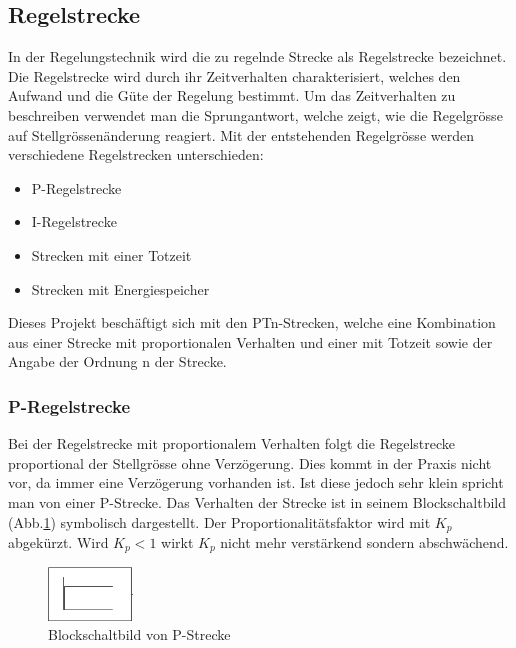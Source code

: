 
\subsection{Regelstrecke}
In der Regelungstechnik wird die zu regelnde Strecke als Regelstrecke bezeichnet. Die Regelstrecke wird durch ihr Zeitverhalten charakterisiert, welches den Aufwand und die Güte der Regelung bestimmt. Um das Zeitverhalten zu beschreiben verwendet man die Sprungantwort, welche zeigt, wie die Regelgrösse auf Stellgrössenänderung reagiert. Mit der entstehenden Regelgrösse werden verschiedene Regelstrecken unterschieden:
\begin{itemize}   
 \item  P-Regelstrecke
 \item I-Regelstrecke
 \item    Strecken mit einer Totzeit
 \item Strecken mit Energiespeicher
\end{itemize}

Dieses Projekt beschäftigt sich mit  den PTn-Strecken, welche eine Kombination aus einer Strecke mit proportionalen Verhalten und einer mit Totzeit sowie der Angabe der  Ordnung n der Strecke.

\subsubsection*{P-Regelstrecke}
Bei der Regelstrecke mit proportionalem Verhalten folgt die Regelstrecke proportional der Stellgrösse ohne Verzögerung. Dies kommt in der Praxis nicht vor, da immer eine Verzögerung vorhanden ist. Ist diese jedoch sehr klein spricht man von einer P-Strecke. Das Verhalten der Strecke ist in seinem Blockschaltbild (Abb.\ref {fig:PStrecke}) symbolisch dargestellt. Der Proportionalitätsfaktor wird mit $K_p$ abgekürzt. Wird $K_p<1$ wirkt $K_p$ nicht mehr verstärkend sondern abschwächend.\\
\begin{figure}[h!, width=\pagewidth]
\begin{center}
\includegraphics[width=0.2\textwidth]{images/PStrecke}
\caption{Blockschaltbild von P-Strecke}
\label{fig:PStrecke}
\end{center}
\end{figure}


